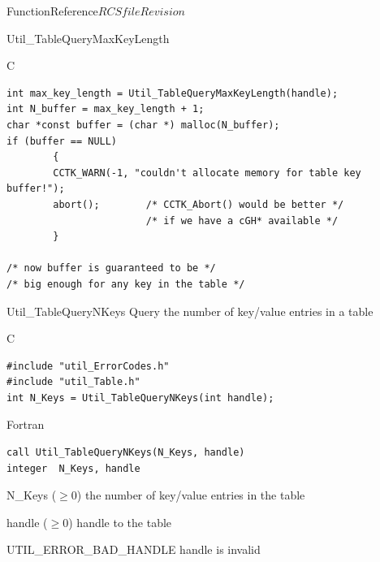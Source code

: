 \begin{cactuspart}{FunctionReference}{$RCSfile$}{$Revision$}
\begin{FunctionDescription}{Util\_TableQueryMaxKeyLength}
\begin{ExampleSection}
\begin{Example}{C}
\begin{verbatim}
int max_key_length = Util_TableQueryMaxKeyLength(handle);
int N_buffer = max_key_length + 1;
char *const buffer = (char *) malloc(N_buffer);
if (buffer == NULL)
        {
        CCTK_WARN(-1, "couldn't allocate memory for table key buffer!");
        abort();        /* CCTK_Abort() would be better */
                        /* if we have a cGH* available */
        }

/* now buffer is guaranteed to be */
/* big enough for any key in the table */
\end{verbatim}
\end{Example}
\end{ExampleSection}
\end{FunctionDescription}


\begin{FunctionDescription}{Util\_TableQueryNKeys}
\label{Util-TableQueryNKeys}
Query the number of key/value entries in a table

\begin{SynopsisSection}
\begin{Synopsis}{C}
\begin{verbatim}
#include "util_ErrorCodes.h"
#include "util_Table.h"
int N_Keys = Util_TableQueryNKeys(int handle);
\end{verbatim}
\end{Synopsis}
\begin{Synopsis}{Fortran}
\begin{verbatim}
call Util_TableQueryNKeys(N_Keys, handle)
integer  N_Keys, handle
\end{verbatim}
\end{Synopsis}
\end{SynopsisSection}

\begin{ResultSection}
\begin{Result}{N\_Keys ($\ge 0$)}
the number of key/value entries in the table
\end{Result}
\end{ResultSection}

\begin{ParameterSection}
\begin{Parameter}{handle ($\ge 0$)}
handle to the table
\end{Parameter}
\end{ParameterSection}

\begin{ErrorSection}
\begin{Error}{UTIL\_ERROR\_BAD\_HANDLE}
handle is invalid
\end{Error}
\end{ErrorSection}
\end{FunctionDescription}


\end{cactuspart}
